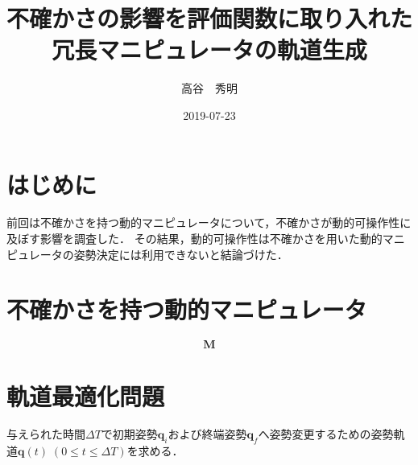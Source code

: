 \documentclass[10pt,a4j,twocolumn]{ltjsarticle}
\title{不確かさの影響を評価関数に取り入れた冗長マニピュレータの軌道生成} %
\author{高谷　秀明}                              %
\date{2019-07-23}                              %
\begin{document}
\maketitle %

\section{はじめに}

前回は不確かさを持つ動的マニピュレータについて，不確かさが動的可操作性に及ぼす影響を調査した．
その結果，動的可操作性は不確かさを用いた動的マニピュレータの姿勢決定には利用できないと結論づけた．

\section{不確かさを持つ動的マニピュレータ}

\begin{equation}
  \bm{M}
\end{equation}

\section{軌道最適化問題}

与えられた時間$\varDelta T$で初期姿勢$\bm{q}_{i}$および終端姿勢$\bm{q}_{f}$へ姿勢変更するための姿勢軌道$\bm{q}(t) \; (0 \leq t \leq \varDelta T)$を求める．
\end{document}
